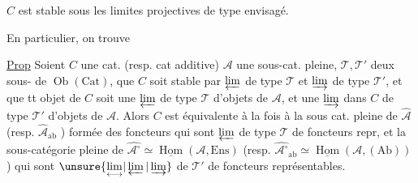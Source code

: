 $C$ est stable sous les limites projectives
de type envisagé.

En particulier, on trouve

\uline{Prop} Soient $C$ une cat. (resp. cat
additive) $\mathcal A$ une sous-cat. pleine,
$\mathcal T,\mathcal T'$ deux sous-
de $\operatorname{Ob}(\mathrm{Cat})$,  que $C$ soit
stable par $\varprojlim$ de type $\mathcal T$ et $\varinjlim$
de type $\mathcal T'$, et que tt objet de
$C$ soit une $\varprojlim$  de type $\mathcal T$ d'objets
de $\mathcal A$, et une $\varinjlim$ dans $C$ de type $\mathcal T'$
d'objets de $\mathcal A$. Alors $C$ est équivalente
à la fois à la sous cat. pleine
de $\widehat{\mathcal A}$ 
(resp. $\widehat{\mathcal A}_{\mathrm{ab}}$ )
formée des
foncteurs  qui sont $\varprojlim$ 
de type $\mathcal T$ de foncteurs repr,
et  la  sous-catégorie pleine de
$\widehat{\mathcal A^\circ}\simeq\underline{\operatorname{Hom}}(\mathcal A,\mathrm{Ens})$ (resp. $\widehat{\mathcal A^\circ}_{\mathrm{ab}}\simeq
\underline{\operatorname{Hom}}(\mathcal A,(\mathrm{Ab}))$) qui sont 
$\unsure{\underset{\longleftrightarrow}{\lim}|\varprojlim|\varinjlim}$ de  $\mathcal T'$ de foncteurs
représentables.
